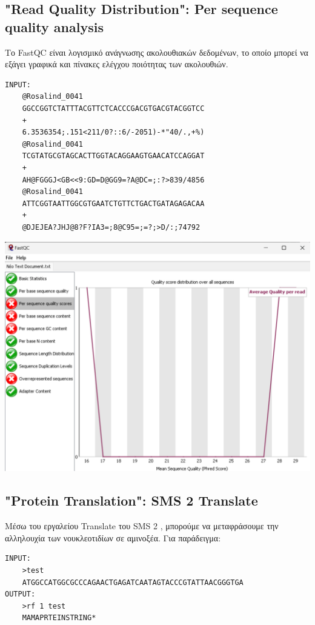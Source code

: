     \subsection{"Read Quality Distribution": Per sequence quality analysis}
        Το FastQC \cite{FastQC} είναι λογισμικό ανάγνωσης ακολουθιακών δεδομένων, το οποίο μπορεί να εξάγει γραφικά και πίνακες ελέγχου ποιότητας των ακολουθιών.
    \begin{graycomment} \footnotesize
    \begin{verbatim}
INPUT:
    @Rosalind_0041
    GGCCGGTCTATTTACGTTCTCACCCGACGTGACGTACGGTCC
    +
    6.3536354;.151<211/0?::6/-2051)-*"40/.,+%)
    @Rosalind_0041
    TCGTATGCGTAGCACTTGGTACAGGAAGTGAACATCCAGGAT
    +
    AH@FGGGJ<GB<<9:GD=D@GG9=?A@DC=;:?>839/4856
    @Rosalind_0041
    ATTCGGTAATTGGCGTGAATCTGTTCTGACTGATAGAGACAA
    +
    @DJEJEA?JHJ@8?F?IA3=;8@C95=;=?;>D/:;74792\end{verbatim}
    \end{graycomment}
    \begin{center} \noindent
        \includegraphics[scale=0.4]{img/FastQC}
    \end{center}

    \subsection{"Protein Translation": SMS 2 Translate}
        Μέσω του εργαλείου Translate του SMS 2 \cite{Translate}, μπορούμε να μεταφράσουμε την αλληλουχία των νουκλεοτιδίων σε αμινοξέα. Για παράδειγμα:

\begin{graycomment} \footnotesize
    \begin{verbatim}
INPUT:
    >test
    ATGGCCATGGCGCCCAGAACTGAGATCAATAGTACCCGTATTAACGGGTGA
OUTPUT:
    >rf 1 test
    MAMAPRTEINSTRING*
\end{verbatim}
\end{graycomment}

